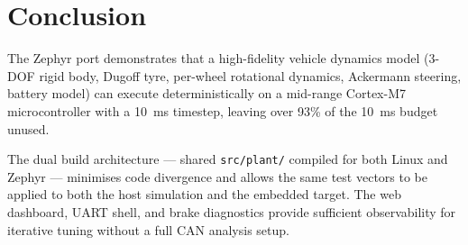 \documentclass[11pt,a4paper]{article}
\begin{document}
\section{Conclusion}

The Zephyr port demonstrates that a high-fidelity vehicle dynamics model
(3-DOF rigid body, Dugoff tyre, per-wheel rotational dynamics, Ackermann
steering, battery model) can execute deterministically on a mid-range
Cortex-M7 microcontroller with a \SI{10}{ms} timestep, leaving over 93\% of
the \SI{10}{ms} budget unused.

The dual build architecture — shared \texttt{src/plant/} compiled for both
Linux and Zephyr — minimises code divergence and allows the same test vectors
to be applied to both the host simulation and the embedded target. The web
dashboard, UART shell, and brake diagnostics provide sufficient observability
for iterative tuning without a full CAN analysis setup.
\end{document}
